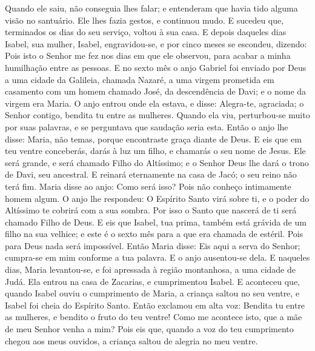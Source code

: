 {  Quando ele saiu, não conseguia lhes falar; e entenderam que havia tido alguma visão no santuário. Ele lhes fazia gestos, e continuou mudo.
  E sucedeu que, terminados os dias do seu serviço, voltou à sua casa.
  E depois daqueles dias Isabel, sua mulher, Isabel, engravidou-se, e por cinco meses se escondeu, dizendo:
  Pois isto o Senhor me fez nos dias em que ele
{} observou, para acabar a minha humilhação entre as pessoas.
  E no sexto mês o anjo Gabriel foi enviado por Deus a uma cidade da Galileia, chamada Nazaré,
  a uma virgem prometida em casamento com um homem chamado José, da descendência
 de Davi; e o nome da virgem era Maria.
  O anjo entrou onde ela estava, e disse: Alegra-te, agraciada; o Senhor
{} contigo, bendita
{} tu entre as mulheres.
  Quando ela
{} viu, perturbou-se muito por suas palavras, e se perguntava que saudação seria esta.
  Então o anjo lhe disse: Maria, não temas, porque encontraste graça diante de Deus.
  E eis que em teu ventre conceberás, darás à luz um filho, e chamarás o seu nome de Jesus.
  Ele será grande, e será chamado Filho do Altíssimo; e o Senhor Deus lhe dará o trono de Davi, seu ancestral.
  E reinará eternamente na casa de Jacó; o seu reino não terá fim.
  Maria disse ao anjo: Como será isso? Pois não conheço intimamente homem algum.
  O anjo lhe respondeu: O Espírito Santo virá sobre ti, e o poder do Altíssimo te cobrirá com a sua sombra. Por isso o Santo que nascerá de ti será chamado Filho de Deus.
  E eis que Isabel, tua prima, também está grávida de um filho na sua velhice; e este é o sexto mês para a que era chamada de estéril.
  Pois para Deus nada será impossível.
  Então Maria disse: Eis aqui a serva do Senhor; cumpra-se em mim conforme a tua palavra. E o anjo ausentou-se dela.
  E naqueles dias, Maria levantou-se, e foi apressada à região montanhosa, a uma cidade de Judá.
  Ela entrou na casa de Zacarias, e cumprimentou Isabel.
  E aconteceu que, quando Isabel ouviu o cumprimento de Maria, a criança saltou no seu ventre, e Isabel foi cheia do Espírito Santo.
  Então exclamou em alta voz: Bendita
{} tu entre as mulheres, e bendito
{} o fruto do teu ventre!
  Como me acontece isto,
 que a mãe de meu Senhor venha a mim?
  Pois eis que, quando a voz do teu cumprimento chegou aos meus ouvidos, a criança saltou de alegria no meu ventre.
}
